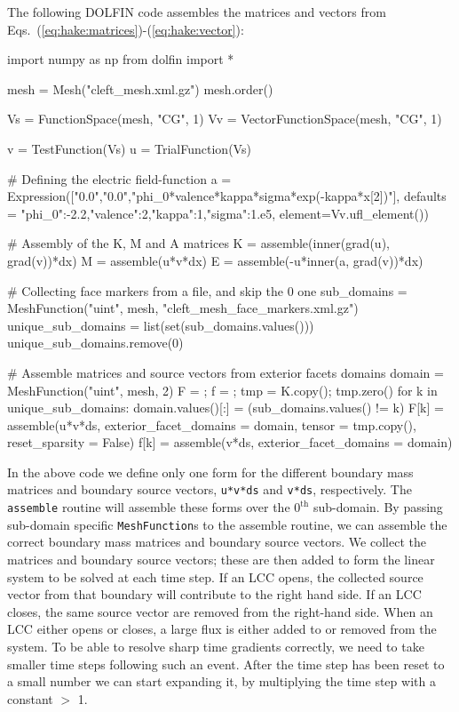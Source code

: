 The following DOLFIN code assembles the matrices and vectors from
Eqs.~(\ref{eq:hake:matrices})-(\ref{eq:hake:vector}):
\begin{python}
import numpy as np
from dolfin import *

mesh = Mesh("cleft_mesh.xml.gz")
mesh.order()

Vs = FunctionSpace(mesh, "CG", 1)
Vv = VectorFunctionSpace(mesh, "CG", 1)

v = TestFunction(Vs)
u = TrialFunction(Vs)

# Defining the electric field-function
a = Expression(["0.0","0.0","phi_0*valence*kappa*sigma*exp(-kappa*x[2])"],
               defaults = {"phi_0":-2.2,"valence":2,"kappa":1,"sigma":1.e5},
               element=Vv.ufl_element())

# Assembly of the K, M and A matrices
K = assemble(inner(grad(u), grad(v))*dx)
M = assemble(u*v*dx)
E = assemble(-u*inner(a, grad(v))*dx)

# Collecting face markers from a file, and skip the 0 one
sub_domains = MeshFunction("uint", mesh, "cleft_mesh_face_markers.xml.gz")
unique_sub_domains = list(set(sub_domains.values()))
unique_sub_domains.remove(0)

# Assemble matrices and source vectors from exterior facets domains
domain = MeshFunction("uint", mesh, 2)
F = {}; f = {}; tmp = K.copy(); tmp.zero()
for k in unique_sub_domains:
    domain.values()[:] = (sub_domains.values() != k)
    F[k] = assemble(u*v*ds, exterior_facet_domains = domain,
                    tensor = tmp.copy(), reset_sparsity = False)
    f[k] = assemble(v*ds, exterior_facet_domains = domain)
\end{python}
In the above code we define only one form for the different boundary
mass matrices and boundary source vectors, \texttt{u*v*ds} and
\texttt{v*ds}, respectively. The \texttt{assemble} routine will
assemble these forms over the $0^{\scriptscriptstyle\text{th}}$
sub-domain. By passing sub-domain specific \texttt{MeshFunction}s to
the assemble routine, we can assemble the correct boundary mass
matrices and boundary source vectors. We collect the matrices and
boundary source vectors; these are then added to form the linear
system to be solved at each time step. If an LCC opens, the collected
source vector from that boundary will contribute to the right hand
side. If an LCC closes, the same source vector are removed from the
right-hand side. When an LCC either opens or closes, a large flux is
either added to or removed from the system. To be able to resolve
sharp time gradients correctly, we need to take smaller time steps
following such an event. After the time step has been reset to a small
number we can start expanding it, by multiplying the time step with a
constant $>$ 1.

